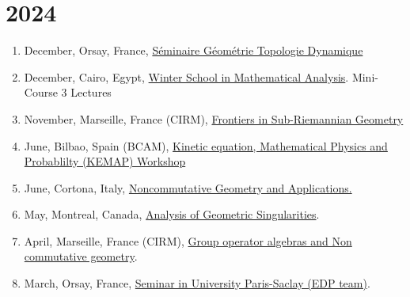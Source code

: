 \documentclass[a4paper, 13pt]{article}
\begin{document}
\section*{2024}
\begin{enumerate}
\item December, Orsay, France, \href{https://www.imo.universite-paris-saclay.fr/fr/events/7496}{Séminaire Géométrie Topologie Dynamique}
\item December, Cairo, Egypt, \href{https://sites.google.com/view/cairowinterschoolinanalysis/home}{Winter School in Mathematical Analysis}. Mini-Course 3 Lectures
\item November, Marseille, France (CIRM), \href{https://conferences.cirm-math.fr/3091.html}{Frontiers in Sub-Riemannian Geometry}
\item June, Bilbao, Spain (BCAM), \href{https://www.bcamath.org/en/kinetic-equation-mathematical-physics-and-probablilty-kemap-workshop}{Kinetic equation, Mathematical Physics and Probablilty (KEMAP) Workshop}
\item June, Cortona, Italy, \href{https://sites.google.com/view/ncg2024cortona}{Noncommutative Geometry and Applications.}
\item May, Montreal, Canada, \href{https://www.crmath.ca/en/activities/#/type/activity/id/3895}{Analysis of Geometric Singularities}.
\item April, Marseille, France (CIRM), \href{https://conferences.cirm-math.fr/2987.html}{Group operator algebras and Non commutative geometry}.
\item March, Orsay, France, \href{https://www.imo.universite-paris-saclay.fr/fr/events/7287}{Seminar in University Paris-Saclay (EDP team)}.
\end{enumerate}
\end{document}
